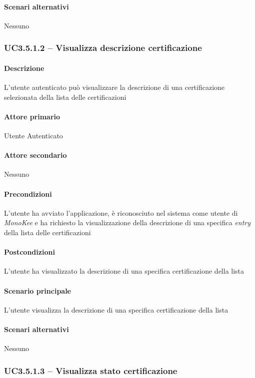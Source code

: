 \paragraph{Scenari alternativi}  Nessuno




\subsubsection{UC3.5.1.2 – Visualizza descrizione certificazione}
\paragraph{Descrizione}  L’utente autenticato può visualizzare la descrizione di una certificazione selezionata della lista delle certificazioni
\paragraph{Attore primario}  Utente Autenticato
\paragraph{Attore secondario}  Nessuno
\paragraph{Precondizioni} L’utente ha avviato l’applicazione, è riconosciuto nel sistema come utente di \textit{MonoKee} e ha richiesto la visualizzazione della descrizione di una specifica \textit{entry} della lista delle certificazioni
\paragraph{Postcondizioni}  L’utente ha visualizzato la descrizione di una specifica certificazione della lista
\paragraph{Scenario principale}  
L’utente visualizza la descrizione di una specifica certificazione della lista
\paragraph{Scenari alternativi}  Nessuno



\subsubsection{UC3.5.1.3 – Visualizza stato certificazione}

